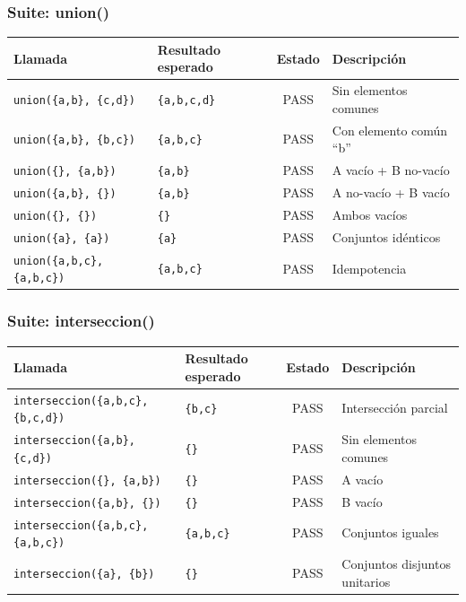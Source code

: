 \documentclass[11pt,a4paper]{article}
\begin{document}
\subsubsection{Suite: union()}
\begin{table}[htbp]
\centering
\small
\begin{tabularx}{\textwidth}{llcX}
\toprule
\textbf{Llamada} & \textbf{Resultado esperado} & \textbf{Estado} & \textbf{Descripción} \\
\midrule
\texttt{union(\{a,b\}, \{c,d\})} & \texttt{\{a,b,c,d\}} & PASS & Sin elementos comunes \\
\texttt{union(\{a,b\}, \{b,c\})} & \texttt{\{a,b,c\}} & PASS & Con elemento común ``b'' \\
\texttt{union(\{\}, \{a,b\})} & \texttt{\{a,b\}} & PASS & A vacío + B no-vacío \\
\texttt{union(\{a,b\}, \{\})} & \texttt{\{a,b\}} & PASS & A no-vacío + B vacío \\
\texttt{union(\{\}, \{\})} & \texttt{\{\}} & PASS & Ambos vacíos \\
\texttt{union(\{a\}, \{a\})} & \texttt{\{a\}} & PASS & Conjuntos idénticos \\
\texttt{union(\{a,b,c\}, \{a,b,c\})} & \texttt{\{a,b,c\}} & PASS & Idempotencia \\
\bottomrule
\end{tabularx}
\end{table}

\subsubsection{Suite: interseccion()}
\begin{table}[htbp]
\centering
\small
\begin{tabularx}{\textwidth}{llcX}
\toprule
\textbf{Llamada} & \textbf{Resultado esperado} & \textbf{Estado} & \textbf{Descripción} \\
\midrule
\texttt{interseccion(\{a,b,c\}, \{b,c,d\})} & \texttt{\{b,c\}} & PASS & Intersección parcial \\
\texttt{interseccion(\{a,b\}, \{c,d\})} & \texttt{\{\}} & PASS & Sin elementos comunes \\
\texttt{interseccion(\{\}, \{a,b\})} & \texttt{\{\}} & PASS & A vacío \\
\texttt{interseccion(\{a,b\}, \{\})} & \texttt{\{\}} & PASS & B vacío \\
\texttt{interseccion(\{a,b,c\}, \{a,b,c\})} & \texttt{\{a,b,c\}} & PASS & Conjuntos iguales \\
\texttt{interseccion(\{a\}, \{b\})} & \texttt{\{\}} & PASS & Conjuntos disjuntos unitarios \\
\bottomrule
\end{tabularx}
\end{table}
\end{document}
